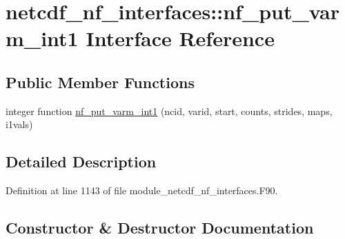 \hypertarget{interfacenetcdf__nf__interfaces_1_1nf__put__varm__int1}{}\section{netcdf\+\_\+nf\+\_\+interfaces\+:\+:nf\+\_\+put\+\_\+varm\+\_\+int1 Interface Reference}
\label{interfacenetcdf__nf__interfaces_1_1nf__put__varm__int1}
\subsection*{Public Member Functions}
\begin{DoxyCompactItemize}
\item 
integer function \hyperlink{interfacenetcdf__nf__interfaces_1_1nf__put__varm__int1_aa0654a44476790d0dcfe39eca4c598dd}{nf\+\_\+put\+\_\+varm\+\_\+int1} (ncid, varid, start, counts, strides, maps, i1vals)
\end{DoxyCompactItemize}


\subsection{Detailed Description}


Definition at line 1143 of file module\+\_\+netcdf\+\_\+nf\+\_\+interfaces.\+F90.



\subsection{Constructor \& Destructor Documentation}
\mbox{\label{interfacenetcdf__nf__interfaces_1_1nf__put__varm__int1_aa0654a44476790d0dcfe39eca4c598dd}} 
